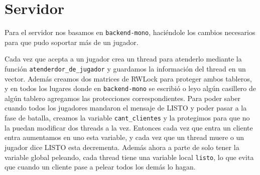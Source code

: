 \documentclass[hidelinks,a4paper,12pt, nofootinbib]{article}
\begin{document}
\section{Servidor}
Para el servidor nos basamos en \texttt{backend-mono}, haciéndole los cambios necesarios para que pudo soportar más de un jugador. 

Cada vez que acepta a un jugador crea un thread para atenderlo mediante la función \texttt{atenderdor\_de\_jugador} y guardamos la información del thread en un vector. Además creamos dos matrices de RWLock para proteger ambos tableros, y en todos los lugares donde en \texttt{backend-mono} se escribió o leyo algún casillero de algún tablero agregamos las protecciones correspondientes.
Para poder saber cuando todos los jugadores mandaron el mensaje de LISTO y poder pasar a la fase de batalla, creamos la variable \texttt{cant\_clientes} y la protegimos para que no la puedan modificar dos threads a la vez. Entonces cada vez que entra un cliente entra aumentamos en uno esta variable, y cada vez que un thread muere o un jugador dice LISTO esta decrementa. Además ahora a parte de solo tener la variable global peleando, cada thread tiene una variable local \texttt{listo}, lo que evita que cuando un cliente pase a pelear todos los demás lo hagan.
\end{document}
